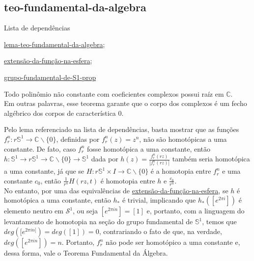 \subsection{teo-fundamental-da-algebra} %
\label{teo-fundamental-da-algebra}
\begin{titlemize}{Lista de dependências}
	\item \hyperref[lema-teo-fundamental-da-algebra]{lema-teo-fundamental-da-algebra};\\ %
	\item \hyperref[extensão-da-função-na-esfera]{extensão-da-função-na-esfera};\\
  \item \hyperref[grupo-fundamental-de-S1-prop]{grupo-fundamental-de-S1-prop}
\end{titlemize}
\begin{thm}

	Todo polinômio não constante com coeficientes complexos possui raíz em $\mathbb{C}$. \\
 
 Em outras palavras, esse teorema garante que o corpo dos complexos é um fecho algébrico dos corpos de característica 0.
 
\end{thm}

\begin{dem}

Pelo lema referenciado na lista de dependências, basta mostrar que as funções $f_r^n: r\mathbb{S}^1 \rightarrow \mathbb{C}\backslash\{0\}$, definidas por $f_r^n(z) = z^n$, não são homotópicas a uma constante.
De fato, caso $f_r^n$ fosse homotópica a uma constante, então $h: \mathbb{S}^1 \rightarrow r\mathbb{S}^1 \rightarrow \mathbb{C}\backslash\{0\} \rightarrow \mathbb{S}^1$ dada por $h(z) = \frac{f_r^n(rz)}{|f_r^n(rz)|}$ também seria homotópica a uma constante, já que se $H:r\mathbb{S}^1 \times I \rightarrow \mathbb{C}\backslash\{0\}$ é a homotopia entre $f_r^n$ e uma constante $c_0$, então $\frac{1}{r^n}H(rz, t)$ é homotopia entre $h$ e $\frac{c_0}{r^n}$.\\
No entanto, por uma das equivalências de \hyperref[extensão-da-função-na-esfera]{extensão-da-função-na-esfera}, se $h$ é homotópica a uma constante, então $h_*$ é trivial, implicando que $h_*([e^{2\pi i}])$ é elemento neutro em $\mathcal{S}^1$, ou seja $[e^{2\pi in}] = [1]$ e, portanto, com a linguagem do levantamento de homotopia na seção do grupo fundamental de $\mathbb{S}^1$, temos que $deg([e^{2\pi in]}) = deg([1]) = 0$, contrariando o fato de que, na verdade, $deg([e^{2\pi in}]) = n$. Portanto, $f_r^n$ não pode ser homotópico a uma constante e, dessa forma, vale o Teorema Fundamental da Álgebra.

    
\end{dem}

